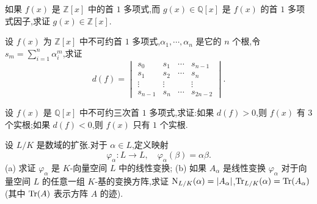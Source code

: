 \begin{Exercises}
  \item 如果 $f(x)$ 是 $\mathbb{Z}[x]$ 中的首 $1$ 多项式,而 $g(x)\in\mathbb{Q}[x]$ 是 $f(x)$ 的首 $1$ 多项式因子,求证 $g(x)\in\mathbb{Z}[x]$.
  \item 设 $f(x)$ 为 $\mathbb{Z}[x]$ 中不可约首 $1$ 多项式,$\alpha_1,\cdots,\alpha_n$ 是它的 $n$ 个根,令 $s_m=\sum_{i=1}^{n}\alpha_i^m$,求证
        \[
          d(f)=\begin{vmatrix}
            s_0 & s_1 & \cdots & s_{n-1}\\
            s_1 & s_2 & \cdots & s_n\\
            \vdots & \vdots & & \vdots\\
            s_{n-1} & s_n & \cdots & s_{2n-2}
          \end{vmatrix}.
        \]
  \item 设 $f(x)$ 是 $\mathbb{Q}[x]$ 中不可约三次首 $1$ 多项式,求证:如果 $d(f)>0$,则 $f(x)$ 有 $3$ 个实根;如果 $d(f)<0$,则 $f(x)$ 只有 $1$ 个实根.
  \item 设 $L/K$ 是数域的扩张.对于 $\alpha\in L$,定义映射
        \[
          \varphi_\alpha\colon L\to L,\quad \varphi_\alpha(\beta)=\alpha\beta.
        \]
        (a) 求证 $\varphi_\alpha$ 是 $K$-向量空间 $L$ 中的线性变换;
        (b) 如果 $A_\alpha$ 是线性变换 $\varphi_\alpha$ 对于向量空间 $L$ 的任意一组 $K$-基的变换方阵,求证 $\mathrm{N}_{L/K}(\alpha)=|A_\alpha|$,$\mathrm{Tr}_{L/K}(\alpha)=\mathrm{Tr}(A_\alpha)$(其中 $\mathrm{Tr}(A)$ 表示方阵 $A$ 的迹).
\end{Exercises}
